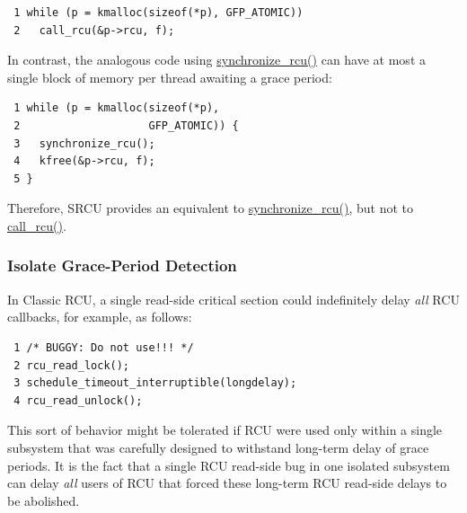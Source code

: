 \vspace{5pt}
\begin{minipage}[t]{\columnwidth}
\small
\begin{verbatim}
 1 while (p = kmalloc(sizeof(*p), GFP_ATOMIC))
 2   call_rcu(&p->rcu, f);
\end{verbatim}
\end{minipage}
\vspace{5pt}

In contrast, the analogous code using \url{synchronize_rcu()} can
have at most a single block of memory per thread awaiting a grace period:

\vspace{5pt}
\begin{minipage}[t]{\columnwidth}
\small
\begin{verbatim}
 1 while (p = kmalloc(sizeof(*p),
 2                    GFP_ATOMIC)) {
 3   synchronize_rcu();
 4   kfree(&p->rcu, f);
 5 }
\end{verbatim}
\end{minipage}
\vspace{5pt}

Therefore, SRCU provides an equivalent to \url{synchronize_rcu()}, but not
to \url{call_rcu()}.

\subsubsection{Isolate Grace-Period Detection}
\label{sec:app:rcuimpl:Isolate Grace-Period Detection}

In Classic RCU, a single read-side critical section could indefinitely
delay \emph{all} RCU callbacks, for example, as follows:

\vspace{5pt}
\begin{minipage}[t]{\columnwidth}
\small
\begin{verbatim}
 1 /* BUGGY: Do not use!!! */
 2 rcu_read_lock();
 3 schedule_timeout_interruptible(longdelay);
 4 rcu_read_unlock();
\end{verbatim}
\end{minipage}
\vspace{5pt}

This sort of behavior might be tolerated if RCU were used only within
a single subsystem that was carefully designed to withstand long-term
delay of grace periods.
It is the fact that a single RCU read-side bug in one isolated subsystem can
delay \emph{all} users of RCU that forced these long-term RCU read-side
delays to be abolished.

